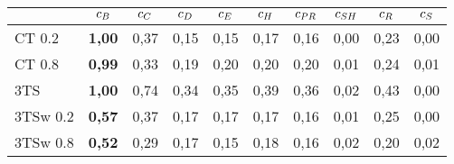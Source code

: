 \begin{tabular}[ht]{l|c|c|c|c|c|c|c|c|c}
\hline
\hline
	& $c_{B}$	& $c_{C}$	& $c_{D}$	& $c_{E}$ & $c_{H}$	& $c_{PR}$ & $c_{SH}$ & $c_{R}$ & $c_{S}$\\
\hline
CT 0.2 & \textbf{1,00} & 0,37 & 0,15 & 0,15 & 0,17 & 0,16 & 0,00 & 0,23 & 0,00\\
CT 0.8 & \textbf{0,99} & 0,33 & 0,19 & 0,20 & 0,20 & 0,20 & 0,01 & 0,24 & 0,01\\
3TS & \textbf{1,00} & 0,74 & 0,34 & 0,35 & 0,39 & 0,36 & 0,02 & 0,43 & 0,00\\
3TSw 0.2 & \textbf{0,57} & 0,37 & 0,17 & 0,17 & 0,17 & 0,16 & 0,01 & 0,25 & 0,00\\
3TSw 0.8 & \textbf{0,52} & 0,29 & 0,17 & 0,15 & 0,18 & 0,16 & 0,02 & 0,20 & 0,02\\
\hline
\hline
\end{tabular}
